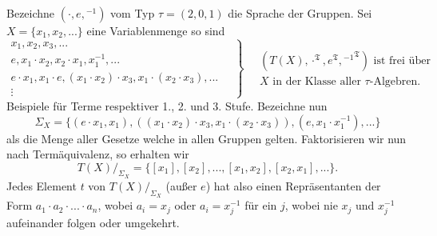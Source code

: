 \begin{example}
    Bezeichne $(\cdot, e, {}^{-1})$ vom Typ $\tau = (2,0,1)$ die Sprache der Gruppen. Sei $X = \{ x_1, x_2, ... \}$ eine Variablenmenge so sind
    $$ \left. \begin{matrix} x_1, x_2, x_3, ... \\ e, x_1 \cdot x_2, x_2 \cdot x_1, x_1^{-1}, ... \\ e \cdot x_1, x_1 \cdot e, (x_1 \cdot x_2) \cdot x_3, x_1 \cdot (x_2 \cdot x_3), ... \\ \vdots \end{matrix} \quad \right\} \quad \begin{matrix} (T(X), \cdot^\mathfrak{T}, e^\mathfrak{T}, {{}^{-1}}^\mathfrak{T}) \textrm{ ist frei über} \\ X \textrm{ in der Klasse aller $\tau$-Algebren.} \end{matrix} $$
    Beispiele für Terme respektiver 1., 2. und 3. Stufe. Bezeichne nun
    $$ \Sigma_X = \{ (e \cdot x_1, x_1), ((x_1 \cdot x_2) \cdot x_3, x_1 \cdot (x_2 \cdot x_3)), (e, x_1 \cdot x_1^{-1}), ... \} $$
    als die Menge aller Gesetze welche in allen Gruppen gelten. Faktorisieren wir nun nach Term\-äquivalenz, so erhalten wir
    $$ T(X) /_{\Sigma_X} = \{ [x_1], [x_2], ..., [x_1, x_2], [x_2, x_1], ... \}. $$
    Jedes Element $t$ von $T(X) /_{\Sigma_X}$ (außer $e$) hat also einen Repräsentanten der Form $a_1 \cdot a_2 \cdot ... \cdot a_n$, wobei $a_i = x_j$ oder $a_i = x_j^{-1}$ für ein $j$, wobei nie $x_j$ und $x_j^{-1}$ aufeinander folgen oder umgekehrt.
\end{example}